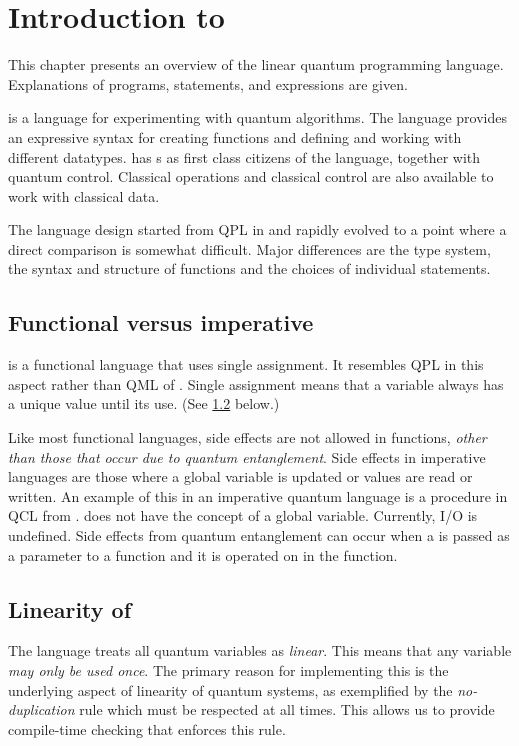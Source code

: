 \lstset{style=inlinqpl}
\section{Introduction to \lqpl}\label{sec:introlqpl}
This chapter  presents an overview of the linear quantum
programming language. Explanations of \lqpl{} programs, statements, 
and expressions are given.


\lqpl{} is  a language for experimenting with  quantum
algorithms. The language provides an expressive syntax for creating functions 
and defining and working
 with different datatypes. \lqpl{} has \qubit{}s as first class
citizens of the language, together with quantum control. 
Classical operations and classical control are also available to 
work with classical data.

The language design started from QPL in \cite{selinger04:qpl}
and rapidly evolved to a point where a direct comparison is 
somewhat difficult.
Major differences are the type system, the syntax and structure of functions
and the choices of individual statements.

\subsection{Functional versus imperative}\label{subsec:lqplfunctionvsimperative}
\lqpl{} is a functional language that uses single assignment. It resembles
QPL in this aspect rather than QML of \cite{alti05:functionalQMLlics}. 
Single assignment means that a variable always has a unique value until its
use. (See \ref{subsec:lqpllinearity} below.)

Like most functional languages, side effects are not allowed in functions, 
\emph{other than those that occur due to quantum entanglement}. Side effects in imperative languages
are those where a global variable is updated or values are read or written. 
An example of this in an imperative
 quantum language is a procedure in QCL from 
\cite{omer:2000}. \lqpl{} does not have the concept of a global variable. 
Currently, I/O is undefined.  Side effects from quantum entanglement can 
occur when a \qubit{} is passed as a parameter to a function and it is
operated on in the function.

\subsection{Linearity of \lqpl}\label{subsec:lqpllinearity}
The language \lqpl{} treats all quantum variables as \emph{linear}. This 
means that any variable \emph{may only be used once}. 
The primary reason for implementing this is the underlying aspect of 
linearity of quantum systems, as exemplified by 
 the \emph{no-duplication} rule which must be respected at all times. 
This allows us to provide
compile-time checking that enforces this rule.


